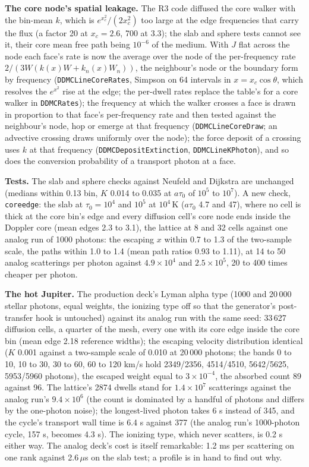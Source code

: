 \documentclass[11pt]{article}
\begin{document}
\textbf{The core node's spatial leakage.}  The R3 code diffused the core walker with
the bin-mean $k$, which is $e^{x_c^2}/(2 x_c^2)$ too large at the edge frequencies that
carry the flux (a factor 20 at $x_c = 2.6$, 700 at 3.3); the slab and sphere tests
cannot see it, their core mean free path being $10^{-6}$ of the medium.  With $J$ flat
across the node each face's rate is now the average over the node of the per-frequency
rate $2/(3W(k(x)W + k_n(x)W_n))$, the neighbour's node or the boundary form by frequency
(\texttt{DDMCLineCoreRates}, Simpson on 64 intervals in $x = x_c\cos\theta$, which
resolves the $e^{x^2}$ rise at the edge; the per-dwell rates replace the table's for a
core walker in \texttt{DDMCRates}); the frequency at which the walker crosses a face is
drawn in proportion to that face's per-frequency rate and then tested against the
neighbour's node, hop or emerge at that frequency (\texttt{DDMCLineCoreDraw}; an
advective crossing draws uniformly over the node); the force deposit of a crossing uses
$k$ at that frequency (\texttt{DDMCDepositExtinction}, \texttt{DDMCLineKPhoton}), and so
does the conversion probability of a transport photon at a face.

\textbf{Tests.}  The slab and sphere checks against Neufeld and Dijkstra are unchanged
(medians within 0.13 bin, $K$ 0.014 to 0.035 at $a\tau_0$ of $10^5$ to $10^7$).  A new
check, \texttt{coreedge}: the slab at $\tau_0 = 10^4$ and $10^5$ at $10^4$\,K ($a\tau_0$
4.7 and 47), where no cell is thick at the core bin's edge and every diffusion cell's
core node ends inside the Doppler core (mean edges 2.3 to 3.1), the lattice at 8 and 32
cells against one analog run of 1000 photons: the escaping $x$ within 0.7 to 1.3 of the
two-sample scale, the paths within 1.0 to 1.4 (mean path ratios 0.93 to 1.11), at 14 to
50 analog scatterings per photon against $4.9\times10^4$ and $2.5\times10^5$, 20 to 400
times cheaper per photon.

\textbf{The hot Jupiter.}  The production deck's Lyman alpha type (1000 and 20\,000
stellar photons, equal weights, the ionizing type off so that the generator's
post-transfer hook is untouched) against its analog run with the same seed: 33\,627
diffusion cells, a quarter of the mesh, every one with its core edge inside the core
bin (mean edge 2.18 reference widths); the escaping velocity distribution identical
($K$ 0.001 against a two-sample scale of 0.010 at 20\,000 photons; the bands 0 to 10, 10
to 30, 30 to 60, 60 to 120 km/s hold 2349/2356, 4514/4510, 5642/5625, 5953/5960
photons), the escaped weight equal to $3\times10^{-4}$, the absorbed count 89 against 96.
The lattice's 2874 dwells stand for $1.4\times10^7$ scatterings against the analog run's
$9.4\times10^6$ (the count is dominated by a handful of photons and differs by the
one-photon noise); the longest-lived photon takes 6 s instead of 345, and the cycle's
transport wall time is 6.4 s against 377 (the analog run's 1000-photon cycle, 157 s,
becomes 4.3 s).  The ionizing type, which never scatters, is 0.2 s either way.  The
analog deck's cost is itself remarkable: 1.2 ms per scattering on one rank against
2.6\,$\mu$s on the slab test; a profile is in hand to find out why.
\end{document}
